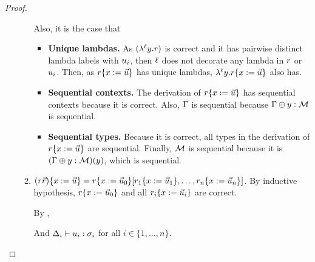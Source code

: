 \begin{proof}
\begin{enumerate}
\begin{enumerate}
     Also, it is the case that
        \indrule{\toI}{
        \tctx \oplus \vartwo : \mtyp \vdash \subs{\tmfour}{\var}{\ls{\tmthree}} : \typtwo
        }{
        \tctx \vdash \lamp{\lab}{\vartwo}{\subs{\tmfour}{\var}{\ls{\tmthree}}} : \mtyp \tolab{\lab} \typtwo
        }
      \begin{itemize}
      \item {\bf Unique lambdas.}
            As $(\lambda^{\ell} y. r)$ is correct and it has pairwise distinct lambda labels with
            $u_i$, then $\ell$ does not decorate any lambda in $r$ or $u_i$.
            Then, as $r\{x := \vec{u}\}$ has unique lambdas,
              $\lambda^{\ell} y. r\{x := \vec{u}\}$ also has.
      \item {\bf Sequential contexts.}
            The derivation of $r\{x := \vec{u}\}$ has sequential contexts because
            it is correct.
            Also, $\Gamma$ is sequential because $\Gamma \oplus y : \mathcal{M}$ is sequential.
      \item {\bf Sequential types.} Because it is correct, all types in the derivation of
                $r\{x := \vec{u}\}$
            are sequential.
            Finally, $\mathcal{M}$ is sequential because it is $(\Gamma \oplus y : \mathcal{M})(y)$, which is sequential.
      \end{itemize}
  \item {}
    $(r \vec{r})\{x := \vec{u}\} =
     r\{x := \vec{u}_0\} [r_1\{x := \vec{u}_1\}, \hdots,
                                            r_n\{x := \vec{u}_n\}]$.
    By inductive hypothesis, $r\{x := \vec{u}_0\}$ and all
      $r_i\{x := \vec{u}_i\}$ are correct.

     By \indrulename{\toE},

     And $\Delta_i \vdash u_i : \sigma_i$ for all $i \in \{1, \hdots, n\}$.


\end{enumerate}
\end{enumerate}
\end{proof}
